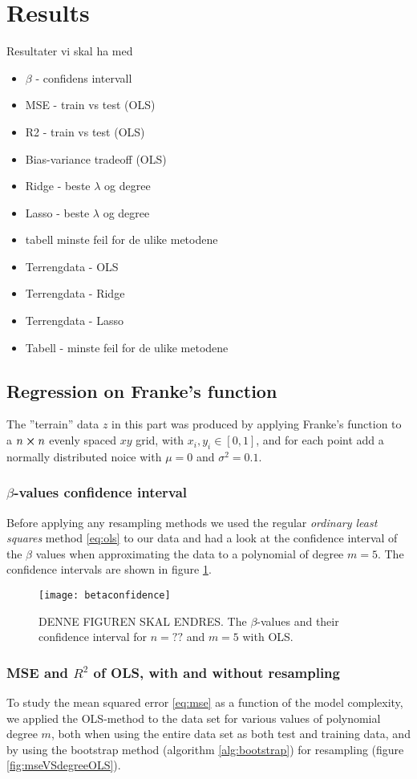 \section{Results}
\label{sec:results}
Resultater vi skal ha med
\begin{itemize}
\item $\beta$ - confidens intervall
\item MSE - train vs test (OLS)
\item R2 - train vs test (OLS)
\item Bias-variance tradeoff (OLS)
\item Ridge - beste $\lambda$ og degree
\item Lasso - beste $\lambda$ og degree
\item tabell minste feil for de ulike metodene
\item Terrengdata - OLS
\item Terrengdata - Ridge
\item Terrengdata - Lasso
\item Tabell - minste feil for de ulike metodene
\end{itemize}
\subsection{Regression on Franke's function}
The {''}terrain'' data $z$ in this part was produced by applying Franke's function to a $n\cross n$ evenly spaced $xy$ grid, with $x_i,y_i\in [0,1]$, and for each point add a normally distributed noice with $\mu = 0$ and $\sigma^2 = 0.1$.
\subsubsection{$\beta$-values confidence interval}
Before applying any resampling methods we used the regular \emph{ordinary least squares} method \eqref{eq:ols} to our data and had a look at the confidence interval of the $\beta$ values when approximating the data to a polynomial of degree $m=5$. The confidence intervals are shown in figure \ref{fig:betaconfidence}.

\begin{figure}[htbp]
	\centering
	\texttt{[image: betaconfidence]}
	\caption{DENNE FIGUREN SKAL ENDRES. The $\beta$-values and their confidence interval for $n=??$ and $m=5$ with OLS.}
	\label{fig:betaconfidence}
\end{figure}

\subsubsection{MSE and $R^2$ of OLS, with and without resampling}
To study the mean squared error \eqref{eq:mse} as a function of the model complexity, we applied the OLS-method to the data set for various values of polynomial degree $m$, both when using the entire data set as both test and training data, and by using the bootstrap method (algorithm \ref{alg:bootstrap}) for resampling (figure \ref{fig:mseVSdegreeOLS}).

